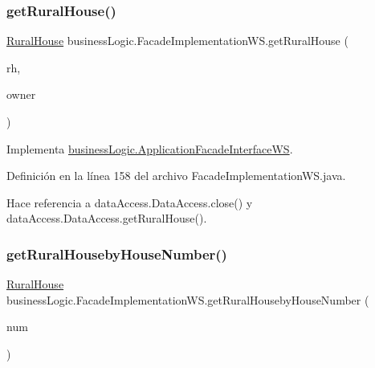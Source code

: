 \subsubsection{\texorpdfstring{getRuralHouse()}{getRuralHouse()}}
{\footnotesize\ttfamily \mbox{\hyperlink{classdomain_1_1_rural_house}{Rural\+House}} business\+Logic.\+Facade\+Implementation\+W\+S.\+get\+Rural\+House (\begin{DoxyParamCaption}\item[{\mbox{\hyperlink{classdomain_1_1_rural_house}{Rural\+House}}}]{rh,  }\item[{\mbox{\hyperlink{classdomain_1_1_owner}{Owner}}}]{owner }\end{DoxyParamCaption})}



Implementa \mbox{\hyperlink{interfacebusiness_logic_1_1_application_facade_interface_w_s_aeda86c46b75acfc4befb30f5d0e98e7c}{business\+Logic.\+Application\+Facade\+Interface\+WS}}.



Definición en la línea 158 del archivo Facade\+Implementation\+W\+S.\+java.


\begin{DoxyCode}{0}

\end{DoxyCode}


Hace referencia a data\+Access.\+Data\+Access.\+close() y data\+Access.\+Data\+Access.\+get\+Rural\+House().

\mbox{\label{classbusiness_logic_1_1_facade_implementation_w_s_a4b08e36f8de023cb541f63a5e772e2be}} 
\subsubsection{\texorpdfstring{getRuralHousebyHouseNumber()}{getRuralHousebyHouseNumber()}}
{\footnotesize\ttfamily \mbox{\hyperlink{classdomain_1_1_rural_house}{Rural\+House}} business\+Logic.\+Facade\+Implementation\+W\+S.\+get\+Rural\+Houseby\+House\+Number (\begin{DoxyParamCaption}\item[{int}]{num }\end{DoxyParamCaption})}



